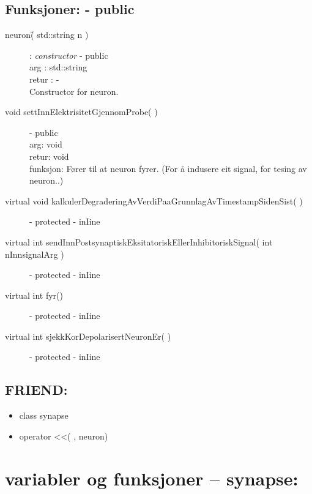 	\section{Funksjoner:  -  	public}
		
		\begin{description}
			\item[neuron\=( std::string n )]   : \textit{constructor} 	- public \\
				arg : 	std::string \\
				retur : 	- \\
				
				Constructor for neuron.
				
			\item[void settInnElektrisitetGjennomProbe( )] 	 		- public 	\\
				arg: 	void 							\\
				retur: 	void 						\\
				funksjon: 	Fører til at neuron fyrer. (For å indusere eit signal, for tesing av neuron..) \\
		
		
			\item[virtual void kalkulerDegraderingAvVerdiPaaGrunnlagAvTimestampSidenSist( )] 			- protected - inIine
			\item[virtual int sendInnPostsynaptiskEksitatoriskEllerInhibitoriskSignal( int nInnsignalArg )] - protected - inIine
			\item[virtual int fyr()] 												- protected - inIine
			\item[virtual int sjekkKorDepolarisertNeuronEr( )] 								- protected - inIine
 		\end{description}
	\section{FRIEND:}
		\begin{itemize}
			\item	class synapse
			\item operator <<( , neuron)
		\end{itemize}


\pagebreak






\chapter{variabler og funksjoner -- synapse:}


